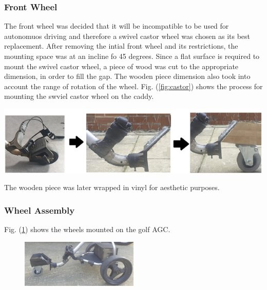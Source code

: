 \documentclass[11pt,landscape]{article}
\newenvironment{Figure}
  {\par\medskip\noindent\minipage{\linewidth}}
  {\endminipage\par\medskip}
\begin{document}
\begin{multicols}{2}
\subsubsection{Front Wheel}
The front wheel was decided that it will be incompatible to be used for
autonomuos driving and therefore a swivel castor wheel was chosen as its best
replacement. After removing the intial front wheel and its restrictions, the
mounting space was at an incline fo 45 degrees. Since a flat surface is required
to mount the swivel castor wheel, a piece of wood was cut to the appropriate
dimension, in order to fill the gap. The wooden piece dimension also took
into account the range of rotation of the wheel. Fig. (\ref{fig:castor}) shows
the process for mounting the swviel castor wheel on the caddy. 

\begin{Figure}
    \begin{center}
        \includegraphics[width=\textwidth]{Figure28.jpg}
        \label{fig:castor}
    \end{center}
\end{Figure}
The wooden piece was later wrapped in vinyl for aesthetic purposes.

\newpage
\subsubsection{Wheel Assembly}
Fig. (\ref{fig:sprayed}) shows the wheels mounted on the golf AGC. 

\begin{figure}[H]
    \begin{center}
        \includegraphics[width=0.5\textwidth]{Figure29.jpg}
        \label{fig:sprayed}
    \end{center}
\end{figure}



\end{multicols}
\end{document}

